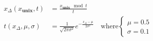 \begin{align}
    x_\Delta(x_{\textbf{unix}}, t) &= \frac{x_\textbf{unix}\mod t}{t} \\
    t(x_\Delta, \mu, \sigma) &= \frac{1}{\sqrt{2\pi\sigma^2}} e^{-\frac{x_\Delta-\mu}{2\sigma^2}} \quad \text{where} \begin{cases}
        \mu = 0.5\\
        \sigma = 0.1
    \end{cases}
\end{align}